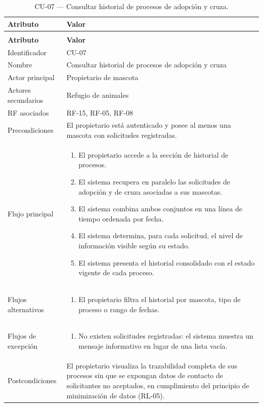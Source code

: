 \documentclass[journal,onecolumn]{IEEEtran}
\makeatletter
\newenvironment{atributos}[2]{%
	\small
	\begin{longtable}{@{}>{\raggedright\arraybackslash}p{4.2cm} >{\raggedright\arraybackslash}p{11.2cm}@{}}
		\caption{#2}\label{tab:#1}\\
		\toprule
		\textbf{Atributo} & \textbf{Valor} \\
		\midrule
		\endfirsthead
		\multicolumn{2}{@{}l}{\small\itshape (continuación)}\\
		\toprule
		\textbf{Atributo} & \textbf{Valor} \\
		\midrule
		\endhead
		\bottomrule
		\endlastfoot
	}{%
	\end{longtable}
	\normalsize
}
\makeatother
\begin{document}
	\begin{atributos}{CU-07}{CU-07 --- Consultar historial de procesos de adopción y cruza.}
		Identificador & CU-07 \\
		Nombre & Consultar historial de procesos de adopción y cruza \\
		Actor principal & Propietario de mascota \\
		Actores secundarios & Refugio de animales \\
		RF asociados & RF-15, RF-05, RF-08 \\
		Precondiciones & El propietario está autenticado y posee al menos una mascota con solicitudes registradas. \\
		Flujo principal &
		\begin{enumerate}[leftmargin=*, nosep]
			\item El propietario accede a la sección de historial de procesos.
			\item El sistema recupera en paralelo las solicitudes de adopción y de cruza asociadas a sus mascotas.
			\item El sistema combina ambos conjuntos en una línea de tiempo ordenada por fecha.
			\item El sistema determina, para cada solicitud, el nivel de información visible según su estado.
			\item El sistema presenta el historial consolidado con el estado vigente de cada proceso.
		\end{enumerate} \\
		Flujos alternativos &
		\begin{enumerate}[leftmargin=*, nosep]
			\item[5.1] El propietario filtra el historial por mascota, tipo de proceso o rango de fechas.
		\end{enumerate} \\
		Flujos de excepción &
		\begin{enumerate}[leftmargin=*, nosep]
			\item[2.1] No existen solicitudes registradas: el sistema muestra un mensaje informativo en lugar de una lista vacía.
		\end{enumerate} \\
		Postcondiciones & El propietario visualiza la trazabilidad completa de sus procesos sin que se expongan datos de contacto de solicitantes no aceptados, en cumplimiento del principio de minimización de datos (RL-05). \\
	\end{atributos}
	
\end{document}
